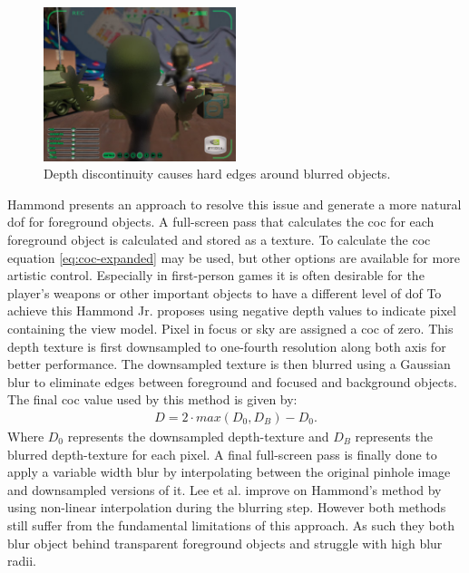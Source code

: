 
\begin{figure}[h]
    \centering
    \includegraphics[width=0.5\textwidth]{images/depth-discontinuity.jpg}
    \caption{Depth discontinuity causes hard edges around blurred objects. \cite{Demers.2005}}
    \label{fig:depth-discontinuity}
\end{figure}

Hammond \cite{Hammon.2008} presents an approach to resolve this issue and generate a more natural \gls{dof} for foreground objects.
A full-screen pass that calculates the \gls{coc} for each foreground object is calculated and stored as a texture.
To calculate the \gls{coc} equation \ref{eq:coc-expanded} may be used, but other options are available for more artistic control.
Especially in first-person games it is often desirable for the player's weapons or other important objects to have a different level of \gls{dof}
To achieve this Hammond Jr. proposes using negative depth values to indicate pixel containing the view model.
Pixel in focus or sky are assigned a \gls{coc} of zero.
This depth texture is first downsampled to one-fourth resolution along both axis for better performance.
The downsampled texture is then blurred using a Gaussian blur to eliminate edges between foreground and focused and background objects.
The final \gls{coc} value used by this method is given by:
\begin{align}
    D = 2 \cdot max(D_0, D_B) - D_0.
\end{align}
Where $D_0$ represents the downsampled depth-texture and $D_B$ represents the blurred depth-texture for each pixel.
A final full-screen pass is finally done to apply a variable width blur by interpolating between the original pinhole image and downsampled versions of it.
Lee et al. \cite{Lee.2009} improve on Hammond's method by using non-linear interpolation during the blurring step.
However both methods still suffer from the fundamental limitations of this approach.
As such they both blur object behind transparent foreground objects and struggle with high blur radii.


